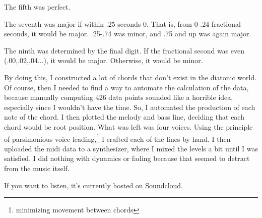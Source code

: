 \documentclass[12pt]{article}[titlepage]
\newcommand{\1}{\={a}}
\newcommand{\2}{\={e}}
\newcommand{\3}{\={\i}}
\newcommand{\4}{\=o}
\newcommand{\5}{\=u}
\newcommand{\6}{\={A}}
\renewcommand{\,}{\textsuperscript{,}}
\begin{document}
The fifth was perfect.

The seventh was major if within .25 seconds 0.
That is, from 0-.24 fractional seconds, it would be major.
.25-.74 was minor, and .75 and up was again major.

The ninth was determined by the final digit.
If the fractional second was even (.00,.02,.04...), it would be major.
Otherwise, it would be minor.

By doing this, I constructed a lot of chords that don't exist in the diatonic world.
Of course, then I needed to find a way to automate the calculation of the data, because manually computing 426 data points sounded like a horrible idea, especially since I wouldn't have the time.
So, I automated the production of each note of the chord.
I then plotted the melody and bass line, deciding that each chord would be root position.
What was left was four voices.
Using the principle of parsimonious voice leading,\footnote{minimizing movement between chords} I crafted each of the lines by hand.
I then uploaded the midi data to a synthesizer, where I mixed the levels a bit until I was satisfied.
I did nothing with dynamics or fading because that seemed to detract from the music itself.

If you want to listen, it's currently hosted on \href{https://soundcloud.com/user-700800182/walk-26-november-2018}{Soundcloud}. 
\end{document}
